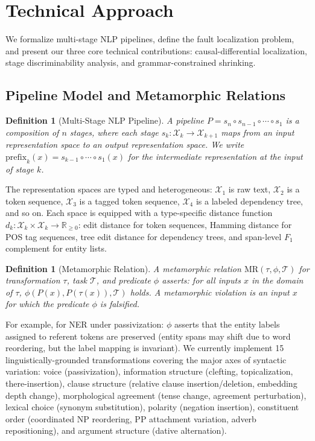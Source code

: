 \documentclass[sigconf,nonacm]{acmart}
\newtheorem{definition}[theorem]{Definition}
\begin{document}
\section{Technical Approach}\label{sec:approach}

We formalize multi-stage NLP pipelines, define the fault localization problem, and present our three core technical contributions: causal-differential localization, stage discriminability analysis, and grammar-constrained shrinking.

\subsection{Pipeline Model and Metamorphic Relations}

\begin{definition}[Multi-Stage NLP Pipeline]
A pipeline $P = s_n \circ s_{n-1} \circ \cdots \circ s_1$ is a composition of $n$ stages, where each stage $s_k : \mathcal{X}_k \to \mathcal{X}_{k+1}$ maps from an input representation space to an output representation space.
We write $\mathrm{prefix}_k(x) = s_{k-1} \circ \cdots \circ s_1(x)$ for the intermediate representation at the input of stage $k$.
\end{definition}

The representation spaces are typed and heterogeneous: $\mathcal{X}_1$ is raw text, $\mathcal{X}_2$ is a token sequence, $\mathcal{X}_3$ is a tagged token sequence, $\mathcal{X}_4$ is a labeled dependency tree, and so on.
Each space is equipped with a type-specific distance function $d_k : \mathcal{X}_k \times \mathcal{X}_k \to \mathbb{R}_{\geq 0}$: edit distance for token sequences, Hamming distance for POS tag sequences, tree edit distance for dependency trees, and span-level $F_1$ complement for entity lists.

\begin{definition}[Metamorphic Relation]
A metamorphic relation $\mathrm{MR}(\tau, \phi, \mathcal{T})$ for transformation $\tau$, task $\mathcal{T}$, and predicate $\phi$ asserts: for all inputs $x$ in the domain of $\tau$, $\phi(P(x), P(\tau(x)), \mathcal{T})$ holds.
A \emph{metamorphic violation} is an input $x$ for which the predicate $\phi$ is falsified.
\end{definition}

For example, for NER under passivization: $\phi$ asserts that the entity labels assigned to referent tokens are preserved (entity spans may shift due to word reordering, but the label mapping is invariant).
We currently implement 15 linguistically-grounded transformations covering the major axes of syntactic variation: voice (passivization), information structure (clefting, topicalization, there-insertion), clause structure (relative clause insertion/deletion, embedding depth change), morphological agreement (tense change, agreement perturbation), lexical choice (synonym substitution), polarity (negation insertion), constituent order (coordinated NP reordering, PP attachment variation, adverb repositioning), and argument structure (dative alternation).
\end{document}
